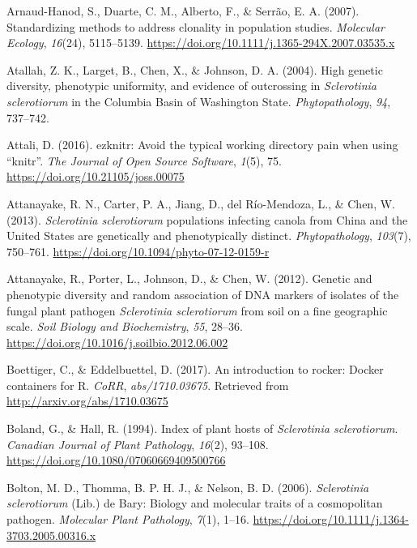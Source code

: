 \documentclass[fleqn,10pt,lineno]{wlpeerj} %
\theoremstyle{definition}
\theoremstyle{definition}
\theoremstyle{definition}
\theoremstyle{remark}
\begin{document}
\hypertarget{ref-arnaud2007standardizing}{}
Arnaud-Hanod, S., Duarte, C. M., Alberto, F., \& Serrão, E. A. (2007).
Standardizing methods to address clonality in population studies.
\emph{Molecular Ecology}, \emph{16}(24), 5115--5139.
\url{https://doi.org/10.1111/j.1365-294X.2007.03535.x}

\hypertarget{ref-atallah2004high}{}
Atallah, Z. K., Larget, B., Chen, X., \& Johnson, D. A. (2004). High
genetic diversity, phenotypic uniformity, and evidence of outcrossing in
\emph{Sclerotinia sclerotiorum} in the Columbia Basin of Washington
State. \emph{Phytopathology}, \emph{94}, 737--742.

\hypertarget{ref-attali2016ezknitr}{}
Attali, D. (2016). ezknitr: Avoid the typical working directory pain
when using ``knitr''. \emph{The Journal of Open Source Software},
\emph{1}(5), 75. \url{https://doi.org/10.21105/joss.00075}

\hypertarget{ref-attanayake2013sclerotinia}{}
Attanayake, R. N., Carter, P. A., Jiang, D., del Río-Mendoza, L., \&
Chen, W. (2013). \emph{Sclerotinia sclerotiorum} populations infecting
canola from China and the United States are genetically and
phenotypically distinct. \emph{Phytopathology}, \emph{103}(7), 750--761.
\url{https://doi.org/10.1094/phyto-07-12-0159-r}

\hypertarget{ref-attanayake2012genetic}{}
Attanayake, R., Porter, L., Johnson, D., \& Chen, W. (2012). Genetic and
phenotypic diversity and random association of DNA markers of isolates
of the fungal plant pathogen \emph{Sclerotinia sclerotiorum} from soil
on a fine geographic scale. \emph{Soil Biology and Biochemistry},
\emph{55}, 28--36. \url{https://doi.org/10.1016/j.soilbio.2012.06.002}

\hypertarget{ref-boettiger2017introduction}{}
Boettiger, C., \& Eddelbuettel, D. (2017). An introduction to rocker:
Docker containers for R. \emph{CoRR}, \emph{abs/1710.03675}. Retrieved
from \url{http://arxiv.org/abs/1710.03675}

\hypertarget{ref-boland1994index}{}
Boland, G., \& Hall, R. (1994). Index of plant hosts of
\emph{Sclerotinia sclerotiorum}. \emph{Canadian Journal of Plant
Pathology}, \emph{16}(2), 93--108.
\url{https://doi.org/10.1080/07060669409500766}

\hypertarget{ref-bolton2006sclerotinia}{}
Bolton, M. D., Thomma, B. P. H. J., \& Nelson, B. D. (2006).
\emph{Sclerotinia sclerotiorum} (Lib.) de Bary: Biology and molecular
traits of a cosmopolitan pathogen. \emph{Molecular Plant Pathology},
\emph{7}(1), 1--16.
\url{https://doi.org/10.1111/j.1364-3703.2005.00316.x}
\end{document}
